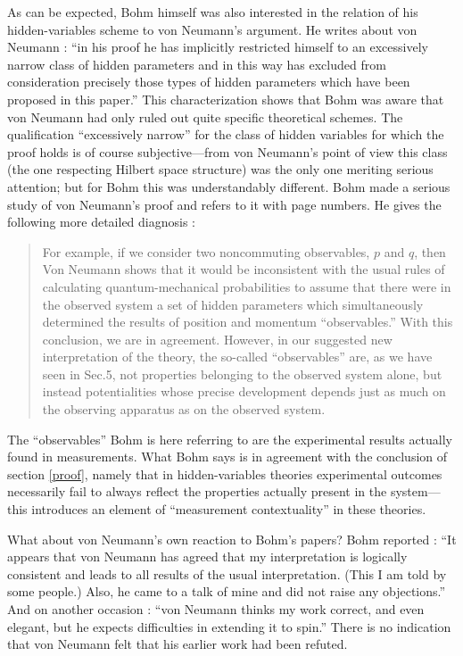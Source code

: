 \documentclass[12pt]{article}
\begin{document}
As can be expected, Bohm himself was also interested in the relation of his hidden-variables scheme to von Neumann's argument. He writes about von Neumann \cite[p.\@ 187]{bohm}: ``in his proof he has implicitly restricted himself to an excessively narrow class of hidden parameters and in this way has excluded from consideration precisely those types of hidden parameters which have been proposed in this paper.'' This characterization shows that Bohm was aware that von Neumann had only ruled out quite specific theoretical schemes. The qualification ``excessively narrow'' for the class of hidden variables for which the proof holds is of course subjective---from von Neumann's point of view this class (the one respecting Hilbert space structure) was the only one meriting serious attention; but for Bohm this was understandably different. Bohm made a serious study of von Neumann's proof and refers to it with page numbers. He gives the following more detailed diagnosis \cite[p.\@  187, see also note 9 on p.\@ 167]{bohm}:
\begin{quote}
  For example, if we consider two noncommuting observables, $p$ and $q$, then Von Neumann shows that it would be inconsistent with the usual rules of calculating quantum-mechanical probabilities to assume that there were in the observed system a set of hidden parameters which simultaneously determined the results of position and momentum ``observables.'' With this conclusion, we are in agreement. However, in our suggested new interpretation of the theory, the so-called ``observables'' are, as we have seen in Sec.\@5, not properties belonging to the observed system alone, but instead potentialities whose precise development depends just as much on the observing apparatus as on the observed system.
\end{quote}
The ``observables'' Bohm is here referring to are the experimental results actually found in measurements. What Bohm says is in agreement with the  conclusion of section \ref{proof}, namely that in hidden-variables theories experimental outcomes necessarily fail to always reflect the properties actually present in the system---this introduces an element of ``measurement contextuality'' in these theories.

What about von Neumann's own reaction to Bohm's papers? Bohm reported \cite{stoltzner}: ``It appears that von Neumann has agreed that my interpretation is logically consistent and leads to all results of the usual interpretation. (This I am told by some people.) Also, he came to a talk of mine and did not raise any objections.'' And on another occasion \cite[p.\@ 47]{freire}: ``von Neumann thinks my work correct, and even elegant, but he expects difficulties in extending it to spin.'' There is no indication that von Neumann felt that his earlier work had been refuted.
\end{document}
